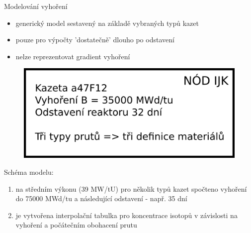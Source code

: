 \documentclass{beamer}
\begin{document}
\begin{frame}{Modelování vyhoření}
	
\begin{block}{}
\begin{itemize}\footnotesize
	\item generický model sestavený na základě vybraných typů kazet 
	\item pouze pro výpočty 'dostatečně' dlouho po odstavení
	\item nelze reprezentovat gradient vyhoření
\end{itemize}
\end{block}
\begin{figure}
	\centering
	\includegraphics[scale=0.6]{img/nod.png}
\end{figure}
Schéma modelu:\\
    \begin{enumerate}\footnotesize
    	\item na středním výkonu (39 MW/tU) pro několik typů kazet spočteno vyhoření do 75000 MWd/tu a následující odstavení - např. 35 dní
    	\item je vytvořena interpolační tabulka pro koncentrace isotopů v závislosti na vyhoření a počátečním obohacení prutu
    \end{enumerate}
  


	
\end{frame}
\end{document}

